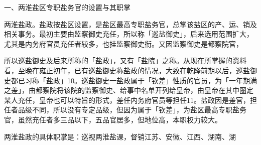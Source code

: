 一、两淮盐区专职盐务官的设置与其职掌

两淮盐政。盐政按盐区设置，是盐区最高专职盐务官，总掌该盐区的产、运、销及相关事务。最初主要由监察御史充任，所以称「巡盐御史」，后来选用范围扩大，尤其是内务府官员充任者较多，也挂监察御史衔。又因监察御史是都察院官，

\vfill
\begin{BookNotes}
\end{BookNotes}

\noindent 所以巡盐御史及后来所称的「盐政」，又有「盐院」之称。从现在所掌握的资料看，至晚在雍正初年，已有巡盐御史称盐政的情况，大致在乾隆前期以后，巡盐御史都已习称「盐政」10。巡盐御史一盐政属于「钦差」性质的官员，为「一年期满之差」，由都察院将该院的监察御史、给事中名单开列给皇帝，由皇帝在其中圈定某人充任，皇帝也可以特旨的形式，差任内务府官员等担任11。盐政因是差官，担任者品级不同，所以没有专定品级，但因为属于「钦差」，为盐区最高专职盐务官，虽然充任者多三品以下，五品官居多，但地位高，本职权力较大。

两淮盐政的具体职掌是：巡视两淮盐课，督销江苏、安徽、江西、湖南、湖

